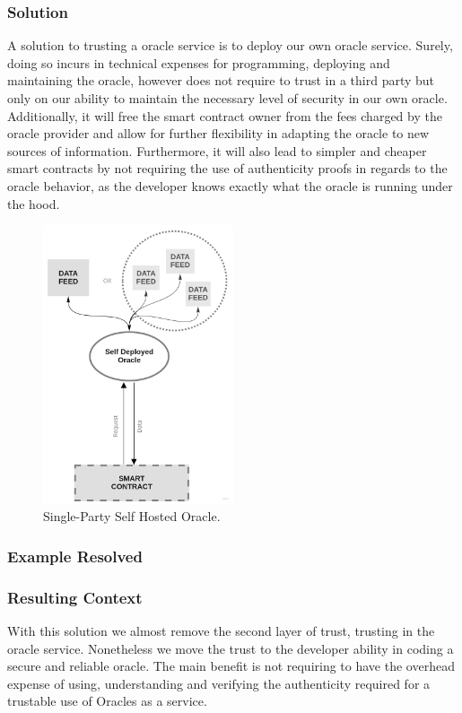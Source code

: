 \subsubsection{Solution}
A solution to trusting a oracle service is to deploy our own oracle service. Surely, doing so incurs in technical expenses for programming, deploying and maintaining the oracle, however does not require to trust in a third party but only on our ability to maintain the necessary level of security in our own oracle. Additionally, it will free the smart contract owner from the fees charged by the oracle provider and allow for further flexibility in adapting the oracle to new sources of information. Furthermore, it will also lead to simpler and cheaper smart contracts by not requiring the use of authenticity proofs in regards to the oracle behavior, as the developer knows exactly what the oracle is running under the hood.

\begin{figure}[t]
  \begin{center}
    \leavevmode
    \includegraphics[width=0.5\textwidth]{figures/oraclearch3.jpg}
    \caption{Single-Party Self Hosted Oracle.}
    \label{fig:/figures/paper-screening}
  \end{center}
\end{figure}


\subsubsection{Example Resolved}
\subsubsection{Resulting Context}
With this solution we almost remove the second layer of trust, trusting in the oracle service. Nonetheless we move the trust to the developer ability in coding a secure and reliable oracle. The main benefit is not requiring to have the overhead expense of using, understanding and verifying the authenticity required for a trustable use of Oracles as a service. 

